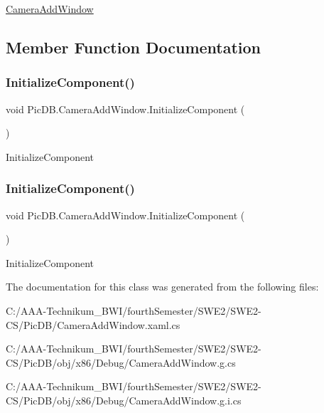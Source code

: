 \mbox{\hyperlink{class_pic_d_b_1_1_camera_add_window}{Camera\+Add\+Window}} 

\subsection{Member Function Documentation}
\mbox{\label{class_pic_d_b_1_1_camera_add_window_abb17f3480dce6c490f858d9f5e65ec8b}} 
\subsubsection{\texorpdfstring{Initialize\+Component()}{InitializeComponent()}\hspace{0.1cm}{\footnotesize\ttfamily [1/2]}}
{\footnotesize\ttfamily void Pic\+D\+B.\+Camera\+Add\+Window.\+Initialize\+Component (\begin{DoxyParamCaption}{ }\end{DoxyParamCaption})}



Initialize\+Component 

\mbox{\label{class_pic_d_b_1_1_camera_add_window_abb17f3480dce6c490f858d9f5e65ec8b}} 
\subsubsection{\texorpdfstring{Initialize\+Component()}{InitializeComponent()}\hspace{0.1cm}{\footnotesize\ttfamily [2/2]}}
{\footnotesize\ttfamily void Pic\+D\+B.\+Camera\+Add\+Window.\+Initialize\+Component (\begin{DoxyParamCaption}{ }\end{DoxyParamCaption})}



Initialize\+Component 



The documentation for this class was generated from the following files\+:\begin{DoxyCompactItemize}
\item 
C\+:/\+A\+A\+A-\/\+Technikum\+\_\+\+B\+W\+I/fourth\+Semester/\+S\+W\+E2/\+S\+W\+E2-\/\+C\+S/\+Pic\+D\+B/Camera\+Add\+Window.\+xaml.\+cs\item 
C\+:/\+A\+A\+A-\/\+Technikum\+\_\+\+B\+W\+I/fourth\+Semester/\+S\+W\+E2/\+S\+W\+E2-\/\+C\+S/\+Pic\+D\+B/obj/x86/\+Debug/Camera\+Add\+Window.\+g.\+cs\item 
C\+:/\+A\+A\+A-\/\+Technikum\+\_\+\+B\+W\+I/fourth\+Semester/\+S\+W\+E2/\+S\+W\+E2-\/\+C\+S/\+Pic\+D\+B/obj/x86/\+Debug/Camera\+Add\+Window.\+g.\+i.\+cs\end{DoxyCompactItemize}
